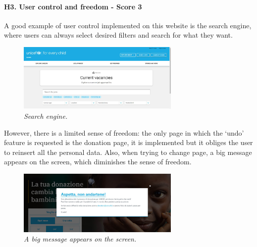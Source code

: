 \newline
\newline \paragraph{H3. User control and freedom - Score 3} \label{subsec:H3}	A good example of user control implemented on this website is the search engine, where users can always select desired filters and search for what they want.
\begin{figure}[!h]
	\begin{center}
		\includegraphics[width=0.7\textwidth]{FinalScores6.jpg}
		\captionsetup{font=small}
		\caption{\textit{Search engine.}}
	\end{center}
\end{figure}
\newline However, there is a limited sense of freedom: the only page in which the ‘undo’ feature is requested is the donation page, it is implemented but it obliges the user to reinsert all the personal data.
\newline Also, when trying to change page, a big message appears on the screen, which diminishes the sense of freedom.
\begin{figure}[!h]
	\begin{center}
		\includegraphics[width=0.7\textwidth]{FinalScores7.jpg}
		\captionsetup{font=small}
		\caption{\textit{A big message appears on the screen.}}
	\end{center}
\end{figure}
\newline
